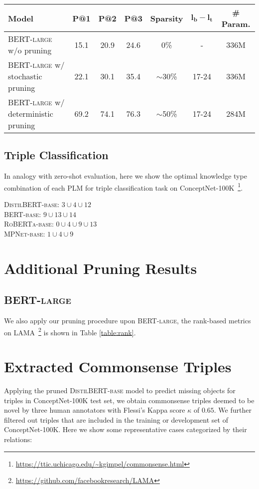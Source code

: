 \documentclass[11pt,a4paper]{article}
\begin{document}
\begin{table*}[tb!]
	\centering
	\footnotesize
	\begin{tabular}{l|ccc|c|c|c}
		\toprule
		\textbf{Model} & \textbf{P@1} & \textbf{P@2} & \textbf{P@3} & \textbf{Sparsity}  & $\bm{l_b-l_t}$ & \textbf{\# Param.}\\
		\midrule
		\textsc{BERT-large} w/o pruning &15.1  &20.9   &24.6  & 0\% & - &336M  \\
		\textsc{BERT-large} w/ stochastic pruning &22.1  &30.1   &35.4   & $\sim$30\% & 17-24 &336M \\
		\textsc{BERT-large} w/ deterministic pruning &69.2  &74.1   &76.3   & $\sim$50\% & 17-24 & 284M\\
		\bottomrule
	\end{tabular}
	\caption{Macro-averaged precision metrics of \textsc{BERT-large} on the ConceptNet subset of LAMA.}
	\label{table:rank}
\end{table*}
\subsection{Triple Classification}
In analogy with zero-shot evaluation, here we show the optimal knowledge type combination of each PLM for triple classification task on ConceptNet-100K~\footnote{\url{https://ttic.uchicago.edu/~kgimpel/commonsense.html}}.

\noindent
\textsc{DistilBERT-base}: $3\cup 4\cup 12$\\
\textsc{BERT-base}: $9\cup 13\cup 14$\\
\textsc{RoBERTa-base}: $0\cup 4\cup 9\cup 13$\\
\textsc{MPNet-base}: $1\cup 4\cup 9$
\section{Additional Pruning Results}
\subsection{\textsc{BERT-large}}
We also apply our pruning procedure upon \textsc{BERT-large}, the rank-based metrics on LAMA~\footnote{\url{https://github.com/facebookresearch/LAMA}} is shown in Table \ref{table:rank}.

\section{Extracted Commonsense Triples}
Applying the pruned \textsc{DistilBERT-base} model to predict missing objects for triples in ConceptNet-100K test set, we obtain commonsense triples deemed to be novel by three human annotators with Flessi's Kappa score $\kappa$ of $0.65$. We further filtered out triples that are included in the training or development set of ConceptNet-100K. Here we show some representative cases categorized by their relations:
\end{document}

